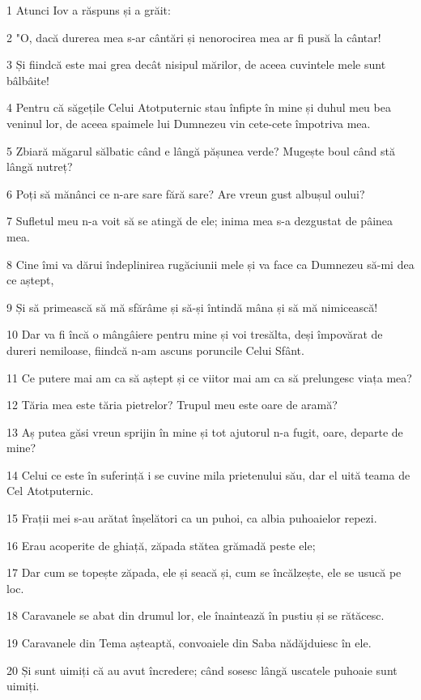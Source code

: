 \par 1 Atunci Iov a răspuns și a grăit:
\par 2 "O, dacă durerea mea s-ar cântări și nenorocirea mea ar fi pusă la cântar!
\par 3 Și fiindcă este mai grea decât nisipul mărilor, de aceea cuvintele mele sunt bâlbâite!
\par 4 Pentru că săgețile Celui Atotputernic stau înfipte în mine și duhul meu bea veninul lor, de aceea spaimele lui Dumnezeu vin cete-cete împotriva mea.
\par 5 Zbiară măgarul sălbatic când e lângă pășunea verde? Mugește boul când stă lângă nutreț?
\par 6 Poți să mănânci ce n-are sare fără sare? Are vreun gust albușul oului?
\par 7 Sufletul meu n-a voit să se atingă de ele; inima mea s-a dezgustat de pâinea mea.
\par 8 Cine îmi va dărui îndeplinirea rugăciunii mele și va face ca Dumnezeu să-mi dea ce aștept,
\par 9 Și să primească să mă sfărâme și să-și întindă mâna și să mă nimicească!
\par 10 Dar va fi încă o mângâiere pentru mine și voi tresălta, deși împovărat de dureri nemiloase, fiindcă n-am ascuns poruncile Celui Sfânt.
\par 11 Ce putere mai am ca să aștept și ce viitor mai am ca să prelungesc viața mea?
\par 12 Tăria mea este tăria pietrelor? Trupul meu este oare de aramă?
\par 13 Aș putea găsi vreun sprijin în mine și tot ajutorul n-a fugit, oare, departe de mine?
\par 14 Celui ce este în suferință i se cuvine mila prietenului său, dar el uită teama de Cel Atotputernic.
\par 15 Frații mei s-au arătat înșelători ca un puhoi, ca albia puhoaielor repezi.
\par 16 Erau acoperite de ghiață, zăpada stătea grămadă peste ele;
\par 17 Dar cum se topește zăpada, ele și seacă și, cum se încălzește, ele se usucă pe loc.
\par 18 Caravanele se abat din drumul lor, ele înaintează în pustiu și se rătăcesc.
\par 19 Caravanele din Tema așteaptă, convoaiele din Saba nădăjduiesc în ele.
\par 20 Și sunt uimiți că au avut încredere; când sosesc lângă uscatele puhoaie sunt uimiți.

